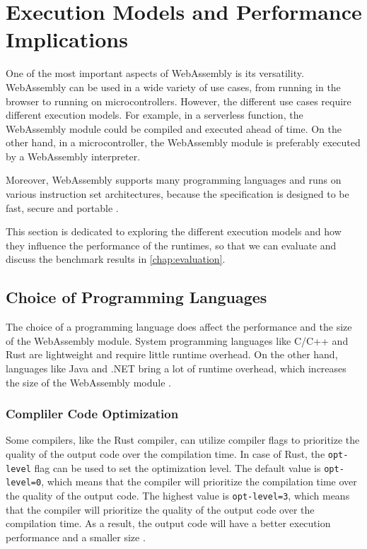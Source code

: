 \section{Execution Models and Performance Implications}
\label{sec:execution-models-and-performance-implications}

One of the most important aspects of WebAssembly is its versatility. WebAssembly can be used in a wide variety of use cases, from running in the browser to running on microcontrollers. However, the different use cases require different execution models. For example, in a serverless function, the WebAssembly module could be compiled and executed ahead of time. On the other hand, in a microcontroller, the WebAssembly module is preferably executed by a WebAssembly interpreter. 

Moreover, \gls{WebAssembly} supports many programming languages and runs on various instruction set architectures, because the specification is designed to be fast, secure and portable \cite{butcher_2023_the}. 

This section is dedicated to exploring the different execution models and how they influence the performance of the runtimes, so that we can evaluate and discuss the benchmark results in \autoref{chap:evaluation}.

\subsection{Choice of Programming Languages}
\label{sec:programming-languages}

The choice of a programming language does affect the performance and the size of the \hbox{WebAssembly} module. System programming languages like C/C++ and Rust are lightweight and require little runtime overhead. On the other hand, languages like Java and .NET bring a lot of runtime overhead, which increases the size of the WebAssembly module \cite{butcher_2023_the}. %

\subsubsection{Compliler Code Optimization}
\label{sec:compliler-code-optimization}

Some compilers, like the Rust compiler, can utilize compiler flags to prioritize the quality of the output code over the compilation time. In case of Rust, the \texttt{opt-level} flag can be used to set the optimization level. The default value is \texttt{opt-level=0}, which means that the compiler will prioritize the compilation time over the quality of the output code. The highest value is \texttt{opt-level=3}, which means that the compiler will prioritize the quality of the output code over the compilation time. As a result, the output code will have a better execution performance and a smaller size \cite{rustlangcommunity_2021_customizing}. 

